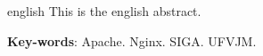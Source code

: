 \begin{resumo}[Abstract]
 \begin{otherlanguage*}{english}
   This is the english abstract.

   \vspace{\onelineskip}
 
   \noindent 
   \textbf{Key-words}: Apache. Nginx. SIGA. UFVJM.
 \end{otherlanguage*}
\end{resumo}